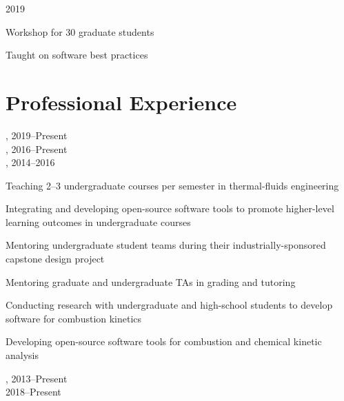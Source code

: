 
\vspace{\baselineskip}

 \hfill 2019
\begin{outerlist}
    \item Workshop for 30 graduate students
    \item Taught on software best practices
\end{outerlist}

\section{{\sectionfont{} Professional Experience}}

,  \hfill 2019--Present\\
,  \hfill 2016--Present\\
,  \hfill 2014--2016

\begin{innerlist}
    \item Teaching 2--3 undergraduate courses per semester in thermal-fluids engineering
    \item Integrating and developing open-source software tools to promote higher-level learning outcomes in undergraduate courses
    \item Mentoring undergraduate student teams during their industrially-sponsored capstone design project
    \item Mentoring graduate and undergraduate TAs in grading and tutoring
    \item Conducting research with undergraduate and high-school students to develop software for combustion kinetics
    \item Developing open-source software tools for combustion and chemical kinetic analysis
\end{innerlist}

\vspace{\baselineskip}

,  \hfill 2013--Present\\
 \hfill 2018--Present

